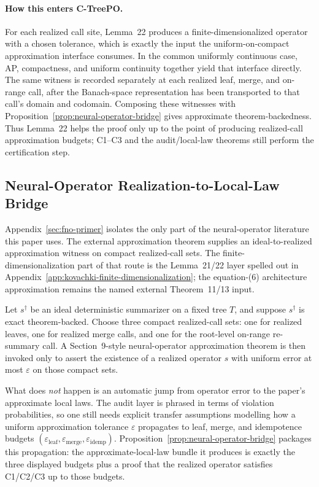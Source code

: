 \paragraph{How this enters C-TreePO.}
For each realized call site, Lemma~22 produces a finite-dimensionalized
operator with a chosen tolerance, which is exactly the input the
uniform-on-compact approximation interface consumes. In the common
uniformly continuous case, AP, compactness, and uniform continuity
together yield that interface directly. The same witness is recorded
separately at each realized leaf, merge, and on-range call, after the
Banach-space representation has been transported to that call's domain
and codomain. Composing these witnesses with
Proposition~\ref{prop:neural-operator-bridge} gives approximate
theorem-backedness. Thus Lemma~22 helps the proof only up to the point
of producing realized-call approximation budgets; C1--C3 and the
audit/local-law theorems still perform the certification step.

\subsection{Neural-Operator Realization-to-Local-Law Bridge}\label{app:approx-via-neural-operators}

Appendix~\ref{sec:fno-primer} isolates the only part of the neural-operator
literature this paper uses. The external approximation theorem supplies an
ideal-to-realized approximation witness on compact realized-call sets. The
finite-dimensionalization part of that route is the Lemma~21/22 layer
spelled out in Appendix~\ref{app:kovachki-finite-dimensionalization}; the
equation-(6) architecture approximation remains the named external
Theorem~11/13 input.

Let $s^\dagger$ be an ideal deterministic summarizer on a fixed tree $T$,
and suppose $s^\dagger$ is exact theorem-backed. Choose three compact
realized-call sets: one for realized leaves, one for realized merge calls,
and one for the root-level on-range re-summary call. A Section~9-style
neural-operator approximation theorem is then invoked only to assert the
existence of a realized operator $s$ with uniform error at most
$\varepsilon$ on those compact sets.

What does \emph{not} happen is an automatic jump from operator error to
the paper's approximate local laws. The audit layer is phrased in terms
of violation probabilities, so one still needs explicit transfer
assumptions modelling how a uniform approximation tolerance $\varepsilon$
propagates to leaf, merge, and idempotence budgets
$(\varepsilon_{\mathrm{leaf}}, \varepsilon_{\mathrm{merge}},
\varepsilon_{\mathrm{idemp}})$. Proposition~\ref{prop:neural-operator-bridge}
packages this propagation: the approximate-local-law bundle it produces
is exactly the three displayed budgets plus a proof that the realized
operator satisfies C1/C2/C3 up to those budgets.

